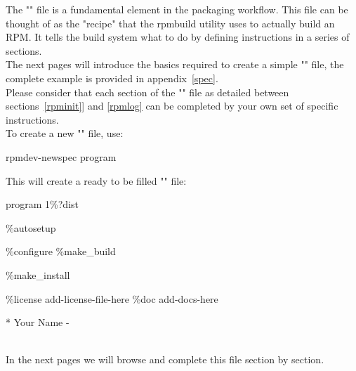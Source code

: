 The "" file is a fundamental element in the packaging workflow. 
This file can be thought of as the "recipe" that the rpmbuild utility uses to actually build an RPM. 
It tells the build system what to do by defining instructions in a series of sections. \\
The next pages will introduce the basics required to create a simple "" file, 
the complete example is provided in appendix~\ref{spec}. \\[0.25cm]
Please consider that each section of the "" file as detailed between sections~\ref{rpminit}] and \ref{rpmlog} 
can be completed by your own set of specific instructions. \\[0.25cm] 
\noindent To create a new "" file, use:
\begin{script}
\fprompt{~} rpmdev-newspec program
\end{script}
\clearpage
\noindent This will create a ready to be filled "" file: 
{\footnotesize{
\begin{script}
           program
        1\%{?dist}




\%autosetup

\%configure
\%make\_build

\%make\_install


\%license add-license-file-here
\%doc add-docs-here

*  Your Name \blue{<\email>}
- 
\end{script}
}}
\\
\noindent In the next pages we will browse and complete this file section by section.

